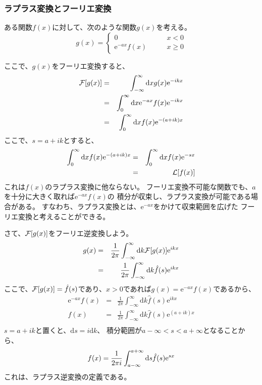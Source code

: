 \documentclass{jarticle}
\newcommand{\diff}{\mathrm d}
\newcommand{\e}{\mathrm e}
\begin{document}
\subsubsection{ラプラス変換とフーリエ変換}

ある関数$f(x)$に対して、次のような関数$g(x)$を考える。
\begin{equation}
  g(x) = \left\{
  \begin{array}{cc}
    0             & \qquad x<0      \\
    \e^{-ax} f(x) & \qquad x \geq 0
  \end{array}
  \right.
\end{equation}

ここで、$g(x)$をフーリエ変換すると、
\begin{eqnarray}
  {\cal F}[g(x)] &=& \int_{-\infty}^{\infty} \diff x g(x) \e^{-ikx}\\
  &=& \int_{0}^{\infty} \diff x \e^{-ax} f(x) \e^{-ikx}\\
  &=& \int_{0}^{\infty} \diff x f(x) \e^{-(a+ik)x}
\end{eqnarray}
ここで、$s = a+ik$とすると、
\begin{eqnarray}
  \int_{0}^{\infty} \diff x f(x) \e^{-(a+ik)x} &=& \int_{0}^{\infty} \diff x f(x) \e^{-sx}\\
  &=& {\cal L}[f(x)]
\end{eqnarray}
これは$f(x)$のラプラス変換に他ならない。
フーリエ変換不可能な関数でも、$a$を十分に大きく取れば$\e^{-ax} f(x)$の
積分が収束し、ラプラス変換が可能である場合がある。
すなわち、ラプラス変換とは、$\e^{-ax}$をかけて収束範囲を広げた
フーリエ変換と考えることができる。

さて、${\cal F}[g(x)]$をフーリエ逆変換しよう。
\begin{eqnarray}
  g(x) &=& \frac{1}{2\pi} \int_{-\infty}^{\infty} \diff k {\cal F}[g(x)] \e^{ikx}\\
  &=& \frac{1}{2\pi} \int_{-\infty}^{\infty} \diff k \hat{f}(s) \e^{ikx}
\end{eqnarray}
ここで、${\cal F}[g(x)] = \hat{f}(s)$であり、$x>0$であれば$g(x) = \e^{-ax} f(x)$であるから、
\begin{eqnarray}
  \e^{-ax} f(x) &=& \frac{1}{2\pi }  \int_{-\infty}^{\infty} \diff k \hat{f}(s) \e^{ikx}\\
  f(x) &=& \frac{1}{2\pi }  \int_{-\infty}^{\infty} \diff k \hat{f}(s) \e^{(a+ik)x}\\
\end{eqnarray}
$s = a + ik$と置くと、$\diff s = i \diff k$、
積分範囲が$a - \infty < s < a + \infty $となることから、
\begin{equation}
  f(x) = \frac{1}{2\pi i}  \int_{a-\infty}^{a+\infty} \diff s \hat{f}(s) \e^{sx}\\
\end{equation}
これは、ラプラス逆変換の定義である。
\end{document}

